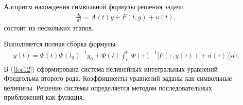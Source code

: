 

Алгоритм нахождения символьной формулы решения задачи
 \begin{eqnarray}
                        \label{for10}
                        \frac{dy}{dt}=A(t)y+F(t,y)+u(t),
                        \end{eqnarray}
состоит из нескольких этапов.




Выполняется полная сборка формулы
 \begin{eqnarray}
      \label{for12}
       y(t)=\Phi(t)\Phi(t_0)^{-1}y_0 + \Phi(t) \int_{t_0}^{t}\Phi(\tau)^{-1}\Big[ F(\tau,y(\tau))+u(\tau))\Big] d\tau.
       \end{eqnarray}
 В (\ref{for12}) сформирована система  нелинейных интегральных уравнений Фредгольма второго рода. Коэффициенты уравнений заданы как символьные величины. Решение системы определяется методом последовательных приближений как функция.

